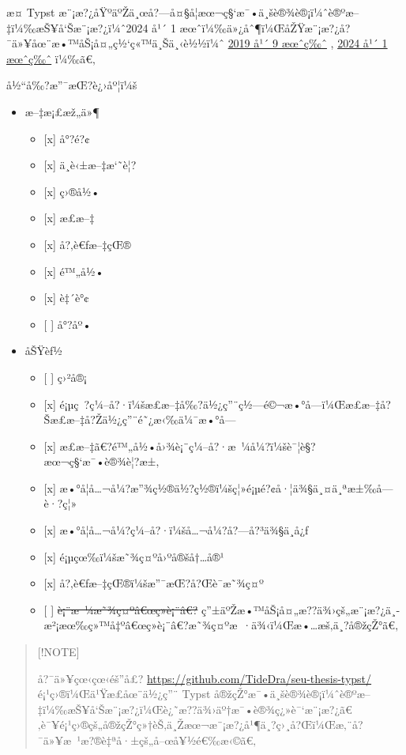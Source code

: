 æ­¤ Typst
æ¨¡æ?¿åŸºäºŽä¸œå?---å¤§å­¦æœ¬ç§`æ¯•ä¸šè®¾è®¡ï¼ˆè®ºæ--‡ï¼‰æŠ¥å`Šæ¨¡æ?¿ï¼ˆ2024
å¹´ 1 æœˆï¼‰ä»¿åˆ¶ï¼ŒåŽŸæ¨¡æ?¿å?¯ä»¥åœ¨æ•™åŠ¡å¤„ç½`ç«™ä¸Šä¸‹è½½ï¼ˆ
\href{https://jwc.seu.edu.cn/2021/1108/c21686a389963/page.htm}{2019 å¹´
9 æœˆç‰ˆ} ,
\href{https://jwc.seu.edu.cn/2024/0117/c21686a479303/page.htm}{2024 å¹´
1 æœˆç‰ˆ} ï¼‰ã€‚

å½``å‰?æ''¯æŒ?è¿›åº¦ï¼š

\begin{itemize}
\tightlist
\item
  æ--‡æ¡£æž„ä»¶

  \begin{itemize}
  \tightlist
  \item
    {[}x{]} å°?é?¢
  \item
    {[}x{]} ä¸­è‹±æ--‡æ`˜è¦?
  \item
    {[}x{]} ç›®å½•
  \item
    {[}x{]} æ­£æ--‡
  \item
    {[}x{]} å?‚è€ƒæ--‡çŒ®
  \item
    {[}x{]} é™„å½•
  \item
    {[}x{]} è‡´è°¢
  \item
    {[} {]} å°?åº•
  \end{itemize}
\item
  åŠŸèƒ½

  \begin{itemize}
  \tightlist
  \item
    {[} {]} ç›²å®¡
  \item
    {[}x{]}
    é¡µç~?ç¼--å?·ï¼šæ­£æ--‡å‰?ä½¿ç''¨ç½---é©¬æ•°å­---ï¼Œæ­£æ--‡å?Šæ­£æ--‡å?Žä½¿ç''¨é˜¿æ‹‰ä¼¯æ•°å­---
  \item
    {[}x{]}
    æ­£æ--‡ã€?é™„å½•å›¾è¡¨ç¼--å?·æ~¼å¼?ï¼šè¯¦è§?æœ¬ç§`æ¯•è®¾è¦?æ±‚
  \item
    {[}x{]}
    æ•°å­¦å\ldots¬å¼?æ''¾ç½®ä½?ç½®ï¼šç¦»é¡µé?¢å·¦ä¾§ä¸¤ä¸ªæ±‰å­---è·?ç¦»
  \item
    {[}x{]} æ•°å­¦å\ldots¬å¼?ç¼--å?·ï¼šå\ldots¬å¼?å?---å?³ä¾§ä¸­å¿ƒ
  \item
    {[}x{]} é¡µçœ‰ï¼šæ˜¾ç¤ºå›ºå®šå†\ldots å®¹
  \item
    {[}x{]} å?‚è€ƒæ--‡çŒ®ï¼šæ''¯æŒ?å?Œè¯­æ˜¾ç¤º
  \item
    {[} {]} \st{è¡¨æ~¼æ˜¾ç¤ºâ€œç»­è¡¨â€?}
    ç''±äºŽæ•™åŠ¡å¤„æ??ä¾›çš„æ¨¡æ?¿ä¸­æ²¡æœ‰ç»™å‡ºâ€œç»­è¡¨â€?æ˜¾ç¤ºæ~·ä¾‹ï¼Œæ•\ldots æš‚ä¸?å®žçŽ°ã€‚
  \end{itemize}
\end{itemize}

\begin{quote}
{[}!NOTE{]}

å?¯ä»¥çœ‹çœ‹éš''å£? \url{https://github.com/TideDra/seu-thesis-typst/}
é¡¹ç›®ï¼Œä¹Ÿæ­£åœ¨ä½¿ç''¨ Typst
å®žçŽ°æ¯•ä¸šè®¾è®¡ï¼ˆè®ºæ--‡ï¼‰æŠ¥å`Šæ¨¡æ?¿ï¼Œè¿˜æ??ä¾›äº†æ¯•è®¾ç¿»è¯`æ¨¡æ?¿ã€‚è¯¥é¡¹ç›®çš„å®žçŽ°ç»†èŠ‚ä¸Žæœ¬æ¨¡æ?¿å¹¶ä¸?ç›¸å?Œï¼Œæ‚¨å?¯ä»¥æ~¹æ?®è‡ªå·±çš„å--œå¥½é€‰æ‹©ã€‚
\end{quote}

